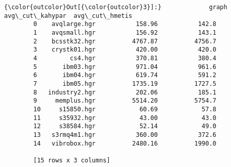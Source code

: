 \documentclass{article}
\begin{document}
            \begin{Verbatim}[commandchars=\\\{\}]
{\color{outcolor}Out[{\color{outcolor}3}]:}             graph  avg\_cut\_kahypar  avg\_cut\_hmetis
        0    avqlarge.hgr           158.96           142.8
        1    avqsmall.hgr           156.92           143.1
        2    bcsstk32.hgr          4767.87          4756.7
        3    crystk01.hgr           420.00           420.0
        4         cs4.hgr           370.81           380.4
        5       ibm03.hgr           971.04           961.6
        6       ibm04.hgr           619.74           591.2
        7       ibm05.hgr          1735.19          1727.5
        8   industry2.hgr           202.06           185.1
        9     memplus.hgr          5514.20          5754.7
        10     s15850.hgr            60.69            57.8
        11     s35932.hgr            43.00            43.0
        12     s38584.hgr            52.14            49.0
        13   s3rmq4m1.hgr           360.00           372.6
        14   vibrobox.hgr          2480.16          1990.0
        
        [15 rows x 3 columns]
\end{Verbatim}
        

    
    
    
    
\end{document}

